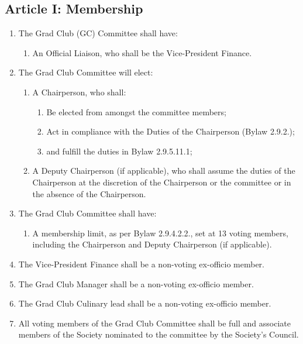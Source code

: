 \subsection{Article I: Membership}
\begin{enumerate}[label*=\arabic*., align=left]	
\item The Grad Club (GC) Committee shall have:
\begin{enumerate}[label*=\arabic*., align=left]	
\item An Official Liaison, who shall be the Vice-President Finance.
\end{enumerate}
\item The Grad Club Committee will elect:
\begin{enumerate}[label*=\arabic*., align=left]
\item A Chairperson, who shall:
\begin{enumerate}[label*=\arabic*., align=left]
\item Be elected from amongst the committee members;
\item Act in compliance with the Duties of the Chairperson (Bylaw 2.9.2.);
\item and fulfill the duties in Bylaw 2.9.5.11.1;
\end{enumerate}
\item A Deputy Chairperson (if applicable), who shall assume the duties of the Chairperson at the discretion of the Chairperson or the committee or in the absence of the Chairperson.
\end{enumerate}
\item The Grad Club Committee shall have:
\begin{enumerate}[label*=\arabic*., align=left]
\item A membership limit, as per Bylaw 2.9.4.2.2., set at 13 voting members, including the Chairperson and Deputy Chairperson (if applicable).
\end{enumerate}
\item The Vice-President Finance shall be a non-voting ex-officio member.
\item The Grad Club Manager shall be a non-voting ex-officio member.
\item The Grad Club Culinary lead shall be a non-voting ex-officio member.
\item All voting members of the Grad Club Committee shall be full and associate members of the Society nominated to the committee by the Society’s Council.     
\end{enumerate}

